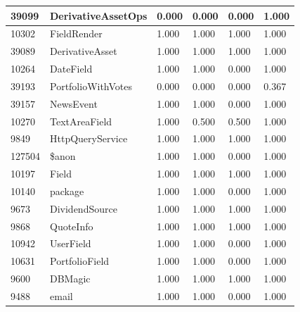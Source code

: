 \documentclass[a4paper]{article}
\newlength{\DUtablewidth} %
\begin{document}
\begin{longtable*}[c]{|p{0.160\DUtablewidth}|p{0.160\DUtablewidth}|p{0.160\DUtablewidth}|p{0.160\DUtablewidth}|p{0.160\DUtablewidth}|p{0.160\DUtablewidth}|}
39099
 & 
DerivativeAssetOps
 & 
0.000
 & 
0.000
 & 
0.000
 & 
1.000
 \\
\hline

10302
 & 
FieldRender
 & 
1.000
 & 
1.000
 & 
1.000
 & 
1.000
 \\
\hline

39089
 & 
DerivativeAsset
 & 
1.000
 & 
1.000
 & 
1.000
 & 
1.000
 \\
\hline

10264
 & 
DateField
 & 
1.000
 & 
1.000
 & 
0.000
 & 
1.000
 \\
\hline

39193
 & 
PortfolioWithVotes
 & 
0.000
 & 
0.000
 & 
0.000
 & 
0.367
 \\
\hline

39157
 & 
NewsEvent
 & 
1.000
 & 
1.000
 & 
0.000
 & 
1.000
 \\
\hline

10270
 & 
TextAreaField
 & 
1.000
 & 
0.500
 & 
0.500
 & 
1.000
 \\
\hline

9849
 & 
HttpQueryService
 & 
1.000
 & 
1.000
 & 
1.000
 & 
1.000
 \\
\hline

127504
 & 
\$anon
 & 
1.000
 & 
1.000
 & 
0.000
 & 
1.000
 \\
\hline

10197
 & 
Field
 & 
1.000
 & 
1.000
 & 
1.000
 & 
1.000
 \\
\hline

10140
 & 
package
 & 
1.000
 & 
1.000
 & 
0.000
 & 
1.000
 \\
\hline

9673
 & 
DividendSource
 & 
1.000
 & 
1.000
 & 
1.000
 & 
1.000
 \\
\hline

9868
 & 
QuoteInfo
 & 
1.000
 & 
1.000
 & 
1.000
 & 
1.000
 \\
\hline

10942
 & 
UserField
 & 
1.000
 & 
1.000
 & 
0.000
 & 
1.000
 \\
\hline

10631
 & 
PortfolioField
 & 
1.000
 & 
1.000
 & 
0.000
 & 
1.000
 \\
\hline

9600
 & 
DBMagic
 & 
1.000
 & 
1.000
 & 
1.000
 & 
1.000
 \\
\hline

9488
 & 
email
 & 
1.000
 & 
1.000
 & 
0.000
 & 
1.000
 \\
\hline


\end{longtable*}
\end{document}
